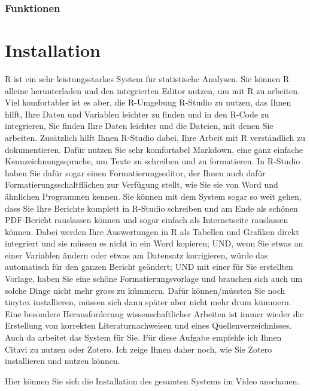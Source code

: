\documentclass[twoside, pagesize, fontsize=11pt, dvipsnames]{scrreport}
\begin{document}
\hypertarget{funktionen}{%
\subsection{Funktionen}\label{funktionen}}


\hypertarget{Installation}{%
\chapter{Installation}\label{Installation}}

R ist ein sehr leistungsstarkes System für statistische Analysen. Sie
können R alleine herunterladen und den integrierten Editor nutzen, um
mit R zu arbeiten. Viel komfortabler ist es aber, die R-Umgebung
R-Studio zu nutzen, das Ihnen hilft, Ihre Daten und Variablen leichter
zu finden und in den R-Code zu integrieren, Sie finden Ihre Daten
leichter und die Dateien, mit denen Sie arbeiten. Zusätzlich hilft Ihnen
R-Studio dabei, Ihre Arbeit mit R verständlich zu dokumentieren. Dafür
nutzen Sie sehr komfortabel Markdown, eine ganz einfache
Kennzeichnungssprache, um Texte zu schreiben und zu formatieren. In
R-Studio haben Sie dafür sogar einen Formatierungseditor, der Ihnen auch
dafür Formatierungsschaltflächen zur Verfügung stellt, wie Sie sie von
Word und ähnlichen Programmen kennen. Sie können mit dem System sogar so
weit gehen, dass Sie Ihre Berichte komplett in R-Studio schreiben und am
Ende als schönen PDF-Bericht rauslassen können und sogar einfach als
Internetseite rauslassen können. Dabei werden Ihre Auswertungen in R als
Tabellen und Grafiken direkt integriert und sie müssen es nicht in ein
Word kopieren; UND, wenn Sie etwas an einer Variablen ändern oder etwas
am Datensatz korrigieren, würde das automatisch für den ganzen Bericht
geändert; UND mit einer für Sie erstellten Vorlage, haben Sie eine
schöne Formatierungsvorlage und brauchen sich auch um solche Dinge nicht
mehr gross zu kümmern. Dafür können/müssten Sie noch tinytex
installieren, müssen sich dann später aber nicht mehr drum kümmern. Eine
besondere Herausforderung wissenschaftlicher Arbeiten ist immer wieder
die Erstellung von korrekten Literaturnachweisen und eines
Quellenverzeichnisses. Auch da arbeitet das System für Sie. Für diese
Aufgabe empfehle ich Ihnen Citavi zu nutzen oder Zotero. Ich zeige Ihnen
daher noch, wie Sie Zotero installieren und nutzen können.

Hier können Sie sich die Installation des gesamten Systems im Video
anschauen.
\end{document}
